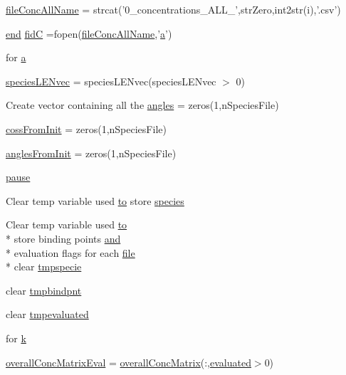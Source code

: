 \begin{DoxyCompactItemize}
\item 
\hyperlink{a00025_a45b397c4e1bd8e68da97ba6d26fbb41f}{file\-Conc\-All\-Name} = strcat('0\-\_\-concentrations\-\_\-\-A\-L\-L\-\_\-',str\-Zero,int2str(i),'.\-csv')
\item 
\hyperlink{a00025_afb358f48b1646c750fb9da6c6585be2b}{end} \hyperlink{a00025_a5650dbe23ad9065391c1ea56f8acd34c}{fid\-C} =fopen(\hyperlink{a00025_a45b397c4e1bd8e68da97ba6d26fbb41f}{file\-Conc\-All\-Name},'\hyperlink{a00035_a2ffdbad9ea59541e59cbd2b938e0770c}{a}')
\item 
for \hyperlink{a00025_a230414213a9710ed03b6cf8d2695ee94}{a}
\item 
\hyperlink{a00025_a728fdfd72d1bd5110134afd6e09e99da}{species\-L\-E\-Nvec} = species\-L\-E\-Nvec(species\-L\-E\-Nvec $>$ 0)
\item 
Create vector containing all the \hyperlink{a00025_aee6c8457aab4cc643bbdaea8794ca74e}{angles} = zeros(1,n\-Species\-File)
\item 
\hyperlink{a00025_a547b10724f74451f717078739944cc74}{coss\-From\-Init} = zeros(1,n\-Species\-File)
\item 
\hyperlink{a00025_a860d662b73220f44f28099dfa9d3de76}{angles\-From\-Init} = zeros(1,n\-Species\-File)
\item 
\hyperlink{a00025_afd7d49e17b69bd6bf3d7a649856c1067}{pause}
\item 
Clear temp variable used \hyperlink{a00028_af71dbe52628a3f83a77ab494817525c6}{to} store \hyperlink{a00025_a0e465545a27eaf9ca2c9710f744963c4}{species}
\item 
Clear temp variable used \hyperlink{a00028_af71dbe52628a3f83a77ab494817525c6}{to} \\*
store binding points \hyperlink{a00028_a170f8acb213f91bf71c77b1d20bceb33}{and} \\*
evaluation flags for each \hyperlink{a00110_a4e8353d6c62cf54bf4a1a8f63e56b8c3}{file} \\*
clear \hyperlink{a00025_a045ecd9b02a87529b837dde223b08719}{tmpspecie}
\item 
clear \hyperlink{a00025_a5767512ebb74a4931fc7193b57426f9f}{tmpbindpnt}
\item 
clear \hyperlink{a00025_a4e591f841c52d48a504874598be0542a}{tmpevaluated}
\item 
for \hyperlink{a00025_ab7005e24e9bb6ea9b6e14c4ac2614a31}{k}
\item 
\hyperlink{a00025_ad9fb43d1f2f660ac0e99cc638e5ac774}{overall\-Conc\-Matrix\-Eval} = \hyperlink{a00025_a576dd8edd1b0fd4cc65709a59b308518}{overall\-Conc\-Matrix}(\-:,\hyperlink{a00025_a5e1fe2a8074aede6ad4a7a0613f0f91c}{evaluated}$>$0)
\end{DoxyCompactItemize}


